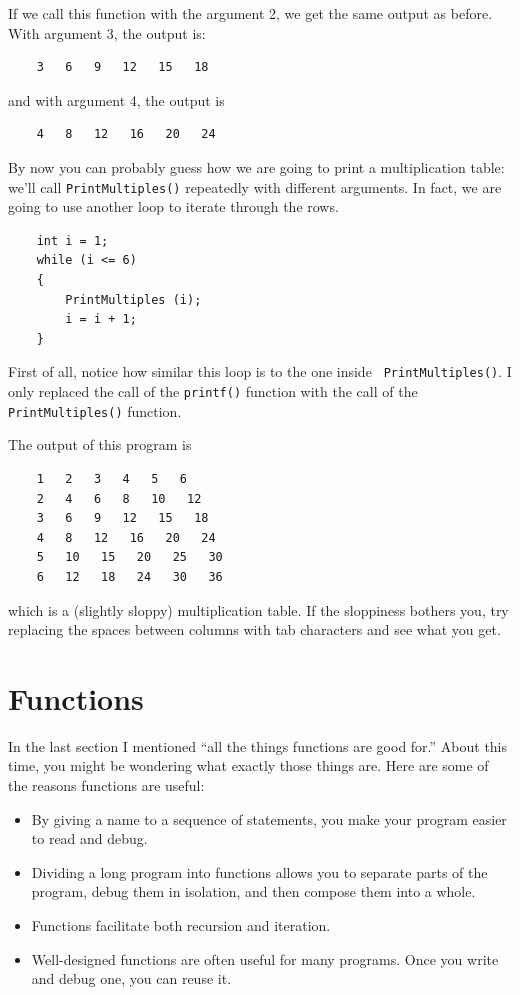 If we call this function with the argument 2, we get the same
output as before.  With argument 3, the output is:

\begin{verbatim}
    3   6   9   12   15   18
\end{verbatim}
%
and with argument 4, the output is

\begin{verbatim}
    4   8   12   16   20   24 
\end{verbatim}
%
By now you can probably guess how we are going to print a
multiplication table: we'll call {\tt PrintMultiples()} repeatedly with
different arguments.  In fact, we are going to use another loop to
iterate through the rows.

\begin{verbatim}
    int i = 1;
    while (i <= 6) 
    {
        PrintMultiples (i);
        i = i + 1;
    }    
\end{verbatim}
%
First of all, notice how similar this loop is to the one inside {\tt
PrintMultiples()}.  I only replaced the call of the \texttt{printf()} function with 
the call of the \texttt{PrintMultiples()} function.

The output of this program is

\begin{verbatim}
    1   2   3   4   5   6   
    2   4   6   8   10   12   
    3   6   9   12   15   18   
    4   8   12   16   20   24   
    5   10   15   20   25   30   
    6   12   18   24   30   36   
\end{verbatim}
%
which is a (slightly sloppy) multiplication table.  If the
sloppiness bothers you, try replacing the spaces between
columns with tab characters and see what you get.

\section{Functions}

In the last section I mentioned ``all the things functions
are good for.''  About this time, you might be wondering
what exactly those things are.  Here are some of the reasons
functions are useful:

\begin{itemize}

\item By giving a name to a sequence of statements, you make
your program easier to read and debug.

\item Dividing a long program into functions allows you to
separate parts of the program, debug them in isolation, and
then compose them into a whole.

\item Functions facilitate both recursion and iteration.

\item Well-designed functions are often useful for many programs.
Once you write and debug one, you can reuse it.

\end{itemize}


